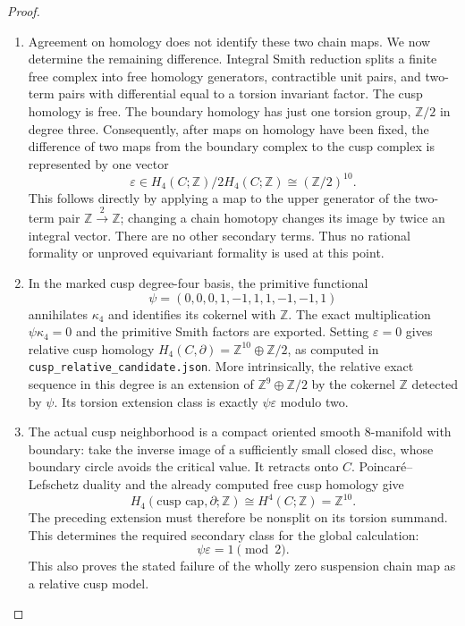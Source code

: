 \begin{proof}
\begin{enumerate}[label=\arabic*.]
\item Agreement on homology does not identify these two chain maps.
We now determine the remaining difference.  Integral Smith reduction
splits a finite free complex into free homology generators, contractible
unit pairs, and two-term pairs with differential equal to a torsion
invariant factor.  The cusp homology is free.  The boundary homology
has just one torsion group, $\mathbb Z/2$ in degree three.
Consequently, after maps on homology have been fixed, the difference
of two maps from the boundary complex to the cusp complex is
represented by one vector
\[
 \varepsilon\in H_4(C;\mathbb Z)/2H_4(C;\mathbb Z)
                 \cong(\mathbb Z/2)^{10}.
\tag{1.19.2}
\]
This follows directly by applying a map to the upper generator of
the two-term pair $\mathbb Z\xrightarrow{2}\mathbb Z$; changing a
chain homotopy changes its image by twice an integral vector.
There are no other secondary terms.  Thus no rational formality or
unproved equivariant formality is used at this point.

\item In the marked cusp degree-four basis, the primitive functional
\[
 \psi=(0,0,0,1,-1,1,1,-1,-1,1)
\tag{1.19.3}
\]
annihilates $\kappa_4$ and identifies its cokernel with $\mathbb Z$.
The exact multiplication $\psi\kappa_4=0$ and the primitive Smith
factors are exported.  Setting $\varepsilon=0$ gives relative
cusp homology $H_4(C,\partial)=\mathbb Z^{10}\oplus\mathbb Z/2$,
as computed in \texttt{cusp\_relative\_candidate.json}.
More intrinsically, the relative exact sequence in this degree is
an extension of $\mathbb Z^9\oplus\mathbb Z/2$ by the cokernel
$\mathbb Z$ detected by $\psi$.  Its torsion extension class is
exactly $\psi\varepsilon$ modulo two.

\item The actual cusp neighborhood is a compact oriented smooth
8-manifold with boundary: take the inverse image of a sufficiently
small closed disc, whose boundary circle avoids the critical value.
It retracts onto $C$.  Poincar\'e--Lefschetz duality and the already
computed free cusp homology give
\[
 H_4(\text{cusp cap},\partial;\mathbb Z)
       \cong H^4(C;\mathbb Z)=\mathbb Z^{10}.
\]
The preceding extension must therefore be nonsplit on its torsion
summand.  This determines the required secondary class for the global
calculation:
\[
                 \psi\varepsilon=1\pmod2.
\tag{1.19.4}
\]
This also proves the stated failure of the wholly zero suspension
chain map as a relative cusp model.


\end{enumerate}
\end{proof}
